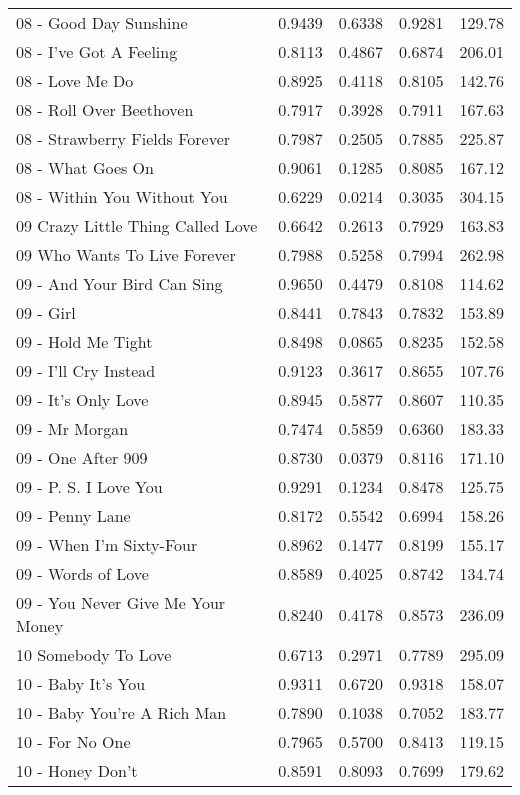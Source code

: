\begin{longtable}[c]{|p{8cm}|c|l|l|l|}
08 - Good Day Sunshine & 0.9439 & 0.6338 & 0.9281 & 129.78 \\
08 - I've Got A Feeling & 0.8113 & 0.4867 & 0.6874 & 206.01 \\
08 - Love Me Do & 0.8925 & 0.4118 & 0.8105 & 142.76 \\
08 - Roll Over Beethoven & 0.7917 & 0.3928 & 0.7911 & 167.63 \\
08 - Strawberry Fields Forever & 0.7987 & 0.2505 & 0.7885 & 225.87 \\
08 - What Goes On & 0.9061 & 0.1285 & 0.8085 & 167.12 \\
08 - Within You Without You & 0.6229 & 0.0214 & 0.3035 & 304.15 \\
09 Crazy Little Thing Called Love & 0.6642 & 0.2613 & 0.7929 & 163.83 \\
09 Who Wants To Live Forever & 0.7988 & 0.5258 & 0.7994 & 262.98 \\
09 - And Your Bird Can Sing & 0.9650 & 0.4479 & 0.8108 & 114.62 \\
09 - Girl & 0.8441 & 0.7843 & 0.7832 & 153.89 \\
09 - Hold Me Tight & 0.8498 & 0.0865 & 0.8235 & 152.58 \\
09 - I'll Cry Instead & 0.9123 & 0.3617 & 0.8655 & 107.76 \\
09 - It's Only Love & 0.8945 & 0.5877 & 0.8607 & 110.35 \\
09 - Mr Morgan & 0.7474 & 0.5859 & 0.6360 & 183.33 \\
09 - One After 909 & 0.8730 & 0.0379 & 0.8116 & 171.10 \\
09 - P. S. I Love You & 0.9291 & 0.1234 & 0.8478 & 125.75 \\
09 - Penny Lane & 0.8172 & 0.5542 & 0.6994 & 158.26 \\
09 - When I'm Sixty-Four & 0.8962 & 0.1477 & 0.8199 & 155.17 \\
09 - Words of Love & 0.8589 & 0.4025 & 0.8742 & 134.74 \\
09 - You Never Give Me Your Money & 0.8240 & 0.4178 & 0.8573 & 236.09 \\
10 Somebody To Love & 0.6713 & 0.2971 & 0.7789 & 295.09 \\
10 - Baby It's You & 0.9311 & 0.6720 & 0.9318 & 158.07 \\
10 - Baby You're A Rich Man & 0.7890 & 0.1038 & 0.7052 & 183.77 \\
10 - For No One & 0.7965 & 0.5700 & 0.8413 & 119.15 \\
10 - Honey Don't & 0.8591 & 0.8093 & 0.7699 & 179.62 \\

\end{longtable}
